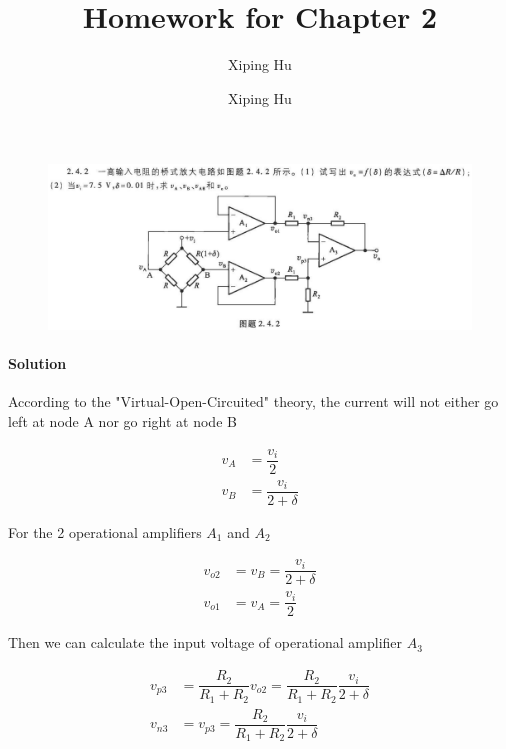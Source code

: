 \documentclass{article}
\author{Xiping Hu}
\author{Xiping Hu}
\affil{http://thehxp.tech/}
\title{Homework for Chapter 2}
\begin{document}
\maketitle

\begin{figure}[H]
  \centering
  \includegraphics[width=0.9\linewidth]{figures/Problem2-1}
  \label{fig:}
\end{figure}

\paragraph{Solution}

According to the "Virtual-Open-Circuited" theory, the current will not either go left at node A nor go right at node B

\begin{equation*}
  \begin{aligned}
    v_A &= \dfrac{v_i}{2} \\
    v_B &= \dfrac{v_i}{2 + \delta} 
  \end{aligned}
\end{equation*}

For the 2 operational amplifiers $A_1$ and $A_2$ 

\begin{equation*}
  \begin{aligned}
    v_{o2} &= v_B = \dfrac{v_i}{2 + \delta} \\
    v_{o1} &= v_A = \dfrac{v_i}{2}
  \end{aligned}
\end{equation*}

Then we can calculate the input voltage of operational amplifier $A_3$

\begin{equation*}
  \begin{aligned}
    v_{p3} &= \dfrac{R_2}{R_1 + R_2} v_{o2} =  \dfrac{R_2}{R_1 + R_2} \dfrac{v_i}{2 + \delta} \\
    v_{n3} &= v_{p3} = \dfrac{R_2}{R_1 + R_2} \dfrac{v_i}{2 + \delta}
  \end{aligned}
\end{equation*}
\end{document}
